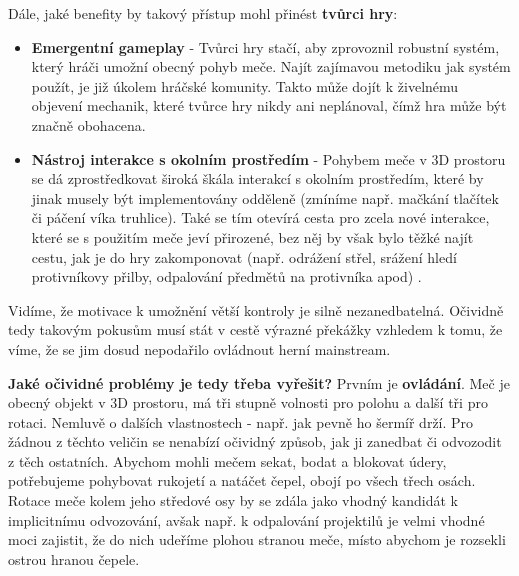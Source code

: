 Dále, jaké benefity by takový přístup mohl přinést \textbf{tvůrci hry}:
\begin{itemize}
    \item \textbf{Emergentní gameplay} - Tvůrci hry stačí, aby zprovoznil robustní systém, který hráči umožní obecný pohyb meče. Najít zajímavou metodiku jak systém použít, je již úkolem hráčské komunity. Takto může dojít k živelnému objevení mechanik, které tvůrce hry nikdy ani neplánoval, čímž hra může být značně obohacena.  
    \item \textbf{Nástroj interakce s okolním prostředím} - Pohybem meče v 3D prostoru se dá zprostředkovat široká škála interakcí s okolním prostředím, které by jinak musely být implementovány odděleně (zmíníme např. mačkání tlačítek či páčení víka truhlice). Také se tím otevírá cesta pro zcela nové interakce, které se s použitím meče jeví přirozené, bez něj by však bylo těžké najít cestu, jak je do hry zakomponovat (např. odrážení střel, srážení hledí protivníkovy přilby, odpalování předmětů na protivníka apod) .   
\end{itemize}

Vidíme, že motivace k umožnění větší kontroly je silně nezanedbatelná. Očividně tedy takovým pokusům musí stát v cestě výrazné překážky vzhledem k tomu, že víme, že se jim dosud nepodařilo ovládnout herní mainstream.

\textbf{Jaké očividné problémy je tedy třeba vyřešit?}
\bigbreak
Prvním je \textbf{ovládání}. Meč je obecný objekt v 3D prostoru, má tři stupně volnosti pro polohu a další tři pro rotaci. Nemluvě o dalších vlastnostech - např. jak pevně ho šermíř drží. Pro žádnou z těchto veličin se nenabízí očividný způsob, jak ji zanedbat či odvozodit z těch ostatních. Abychom mohli mečem sekat, bodat a blokovat údery, potřebujeme pohybovat rukojetí a natáčet čepel, obojí po všech třech osách. Rotace meče kolem jeho středové osy by se zdála jako vhodný kandidát k implicitnímu odvozování, avšak např. k odpalování projektilů je velmi vhodné moci zajistit, že do nich udeříme plohou stranou meče, místo abychom je rozsekli ostrou hranou čepele.

